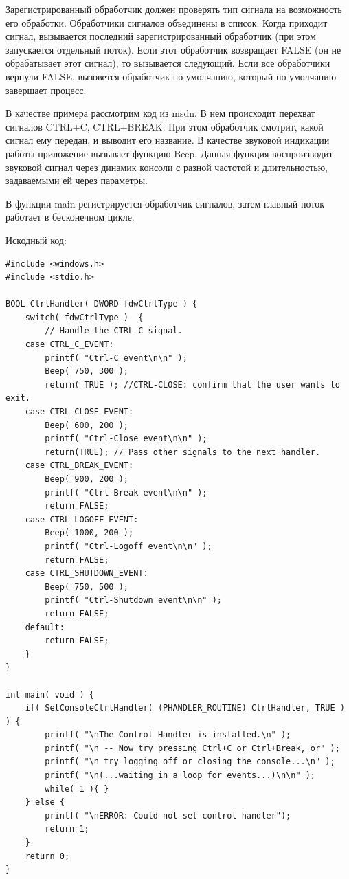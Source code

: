 \documentclass[a4paper]{article}
\begin{document}
	Зарегистрированный обработчик должен проверять тип сигнала на возможность его обработки. Обработчики сигналов объединены в список. Когда приходит сигнал, вызывается последний зарегистрированный обработчик (при этом запускается отдельный поток). Если этот обработчик возвращает FALSE (он не обрабатывает этот сигнал), то вызывается следующий. Если все обработчики вернули FALSE, вызовется обработчик по-умолчанию, который по-умолчанию завершает процесс.
	
	В качестве примера рассмотрим код из msdn. В нем происходит перехват сигналов CTRL+C, CTRL+BREAK. При этом обработчик смотрит, какой сигнал ему передан, и выводит его название. В качестве звуковой индикации работы приложение вызывает функцию Beep. Данная функция воспроизводит звуковой сигнал через динамик консоли с разной частотой и длительностью, задаваемыми ей через параметры.
	
	В функции main регистрируется обработчик сигналов, затем главный поток работает в бесконечном цикле.
	
	Искодный код:
	\begin{lstlisting}[style=crs_cpp]
#include <windows.h> 
#include <stdio.h> 

BOOL CtrlHandler( DWORD fdwCtrlType ) { 
	switch( fdwCtrlType )  { 
		// Handle the CTRL-C signal.
	case CTRL_C_EVENT: 
		printf( "Ctrl-C event\n\n" ); 
		Beep( 750, 300 ); 
		return( TRUE ); //CTRL-CLOSE: confirm that the user wants to exit.
	case CTRL_CLOSE_EVENT: 
		Beep( 600, 200 ); 
		printf( "Ctrl-Close event\n\n" );
		return(TRUE); // Pass other signals to the next handler. 
	case CTRL_BREAK_EVENT:
		Beep( 900, 200 );
		printf( "Ctrl-Break event\n\n" );
		return FALSE;
	case CTRL_LOGOFF_EVENT: 
		Beep( 1000, 200 );
		printf( "Ctrl-Logoff event\n\n" );
		return FALSE;
	case CTRL_SHUTDOWN_EVENT:
		Beep( 750, 500 ); 
		printf( "Ctrl-Shutdown event\n\n" ); 
		return FALSE; 
	default:
		return FALSE; 
	}
} 

int main( void ) {
	if( SetConsoleCtrlHandler( (PHANDLER_ROUTINE) CtrlHandler, TRUE ) ) {
		printf( "\nThe Control Handler is installed.\n" ); 
		printf( "\n -- Now try pressing Ctrl+C or Ctrl+Break, or" ); 
		printf( "\n try logging off or closing the console...\n" ); 
		printf( "\n(...waiting in a loop for events...)\n\n" ); 
		while( 1 ){ } 
	} else { 
		printf( "\nERROR: Could not set control handler");
		return 1; 
	} 
	return 0; 
}
	\end{lstlisting}
	
\end{document}
